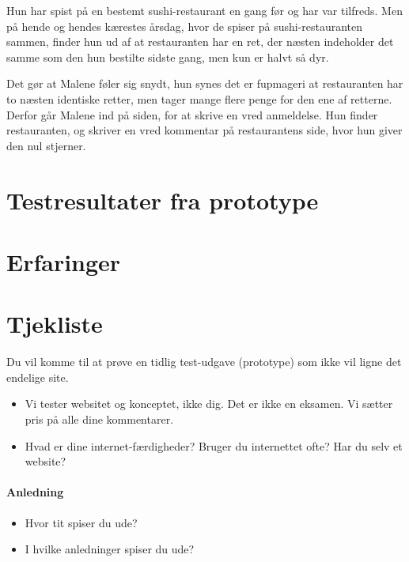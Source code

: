 \documentclass[a4paper, 12pt]{article}
\begin{document}
Hun har spist på en bestemt sushi-restaurant en gang før og har var tilfreds.
Men på hende og hendes kærestes årsdag, hvor de spiser på sushi-restauranten
sammen, finder hun ud af at restauranten har en ret, der næsten indeholder det
samme som den hun bestilte sidste gang, men kun er halvt så dyr.

Det gør at Malene føler sig snydt, hun synes det er fupmageri at restauranten
har to næsten identiske retter, men tager mange flere penge for den ene af
retterne. Derfor går Malene ind på siden, for at skrive en vred anmeldelse.  Hun
finder restauranten, og skriver en vred kommentar på restaurantens side, hvor
hun giver den nul stjerner.
\section{Testresultater fra prototype}
\label{sec:Testresultater fra prototype}

\section{Erfaringer}
\label{sec:Erfaringer}

\clearpage
\appendix

\section{Tjekliste}

Du vil komme til at prøve en tidlig test-udgave (prototype) som ikke vil ligne
det endelige site.
\begin{itemize}
\item Vi tester websitet og konceptet, ikke dig. Det er ikke en
  eksamen. Vi sætter pris på alle dine kommentarer.
\item Hvad er dine internet-færdigheder? Bruger du internettet ofte?
  Har du selv et website?
\end{itemize}

\paragraph{Anledning}
\begin{itemize}
\item Hvor tit spiser du ude?
\item I hvilke anledninger spiser du ude?
\end{itemize}
\end{document}
